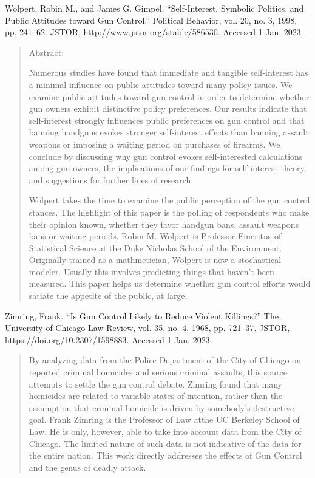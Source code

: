 \documentclass [12pt]{article}
\newcommand{\bibent}{\noindent \hangindent 40pt}
\newcommand{\bibannote}{\begin{quotation}}
\newcommand{\bibendote}{\end{quotation}}
\begin{document}
\bibent Wolpert, Robin M., and James G. Gimpel. “Self-Interest, Symbolic Politics, and Public Attitudes toward Gun Control.” Political Behavior, vol. 20, no. 3, 1998, pp. 241–62. JSTOR, \url{http://www.jstor.org/stable/586530}. Accessed 1 Jan. 2023.
\bibannote
Abstract: \par Numerous studies have found that immediate and tangible self-interest has a minimal influence on public attitudes toward many policy issues. We examine public attitudes toward gun control in order to determine whether gun owners exhibit distinctive policy preferences. Our results indicate that self-interest strongly influences public preferences on gun control and that banning handguns evokes stronger self-interest effects than banning assault weapons or imposing a waiting period on purchases of firearms. We conclude by discussing why gun control evokes self-interested calculations among gun owners, the implications of our findings for self-interest theory, and suggestions for further lines of research. \par
Wolpert takes the time to examine the public perception of the gun control stances. The highlight of this paper is the polling of respondents who make their opinion known, whether they favor handgun bans, assault weapons bans or waiting periods. Robin M. Wolpert is Professor Emeritus of Statistical Science at the Duke Nicholas School of the Environment. Originally trained as a mathmetician, Wolpert is now a stochastical modeler. Usually this involves predicting things that haven't been measured. This paper helps us determine whether gun control efforts would satiate the appetite of the public, at large. 
\bibendote

\bibent Zimring, Frank. “Is Gun Control Likely to Reduce Violent Killings?” The University of Chicago Law Review, vol. 35, no. 4, 1968, pp. 721–37. JSTOR, \url{https://doi.org/10.2307/1598883}. Accessed 1 Jan. 2023.
\bibannote
By analyzing data from the Police Department of the City of Chicago on reported criminal homicides and serious criminal assaults, this source attempts to settle the gun control debate. Zimring found that many homicides are related to variable states of intention, rather than the assumption that criminal homicide is driven by somebody's destructive goal. Frank Zimring is the Professor of Law atthe UC Berkeley School of Law. He is only, however, able to take into account data from the City of Chicago. The limited nature of such data is not indicative of the data for the entire nation. This work directly addresses the effects of Gun Control and the genus of deadly attack.
\bibendote
\end{document}
